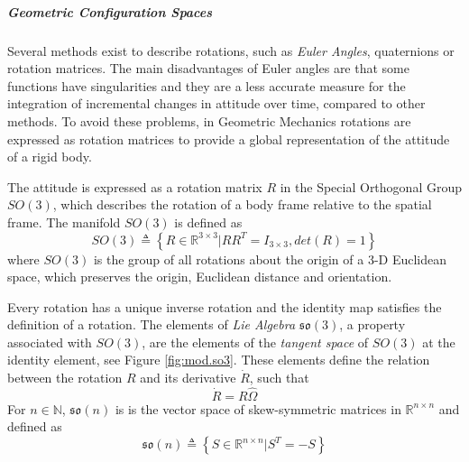 \subparagraph{Geometric Configuration Spaces}
Several methods exist to describe rotations, such as \textit{Euler Angles}, quaternions or rotation matrices. 
The main disadvantages of Euler angles are that some functions have singularities and they are a less accurate measure for the integration of incremental changes in attitude over time, compared to other methods. 
To avoid these problems, in Geometric Mechanics rotations are expressed as rotation matrices to provide a global representation of the attitude of a rigid body. 
 
The  attitude is expressed as a rotation matrix $ R $ in the Special Orthogonal Group $ SO(3) $, which describes the rotation of a body frame relative to the spatial frame. The manifold $ SO(3) $ is defined as
\begin{equation}\label{eq:SO3}
SO(3) \triangleq \left\lbrace R\in\mathbb{R}^{3\times3}|RR^T=I_{3\times3}, det(R)=1\right\rbrace 
\end{equation}
where $ SO(3) $ is the group of all rotations about the origin of a 3-D Euclidean space, which preserves the origin, Euclidean distance and orientation. \cite{Chaturvedi2011,Murray1994}

Every rotation has a unique inverse rotation and the identity map satisfies the definition of a rotation. The elements of \textit{Lie Algebra} $ \mathfrak{so}(3) $, a property associated with $ SO(3) $, are the elements of the \textit{tangent space} of $ SO(3) $ at the identity element, see Figure \ref{fig:mod.so3}. 
These elements define the relation between the rotation $ R $ and its derivative $ \dot{R} $, such that
\begin{equation}\label{eq:Rdot}
\dot{R} = R\hat{\Omega}
\end{equation}
For $ n\in \mathbb{N} $, $ \mathfrak{so}(n) $ is is the vector space of skew-symmetric matrices in $ \mathbb{R}^{n\times n} $ and defined as
\begin{equation}\label{eq:so3}
\mathfrak{so}(n) \triangleq \left\lbrace S\in \mathbb{R}^{n\times n}|S^T=-S\right\rbrace
\end{equation}

